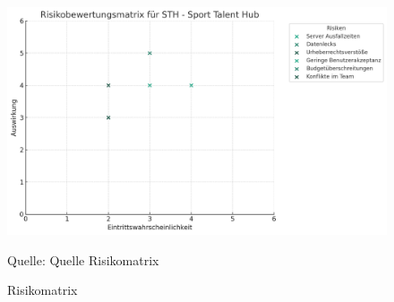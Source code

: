 \begin{figure}
	\caption[Risikomatrix]{Risikomatrix}
	\centering
	\includegraphics[width=\textwidth]{assets/figures/risikomatrix.png}
    \begin{flushleft}
		Quelle: Quelle Risikomatrix
	\end{flushleft}
\end{figure}


